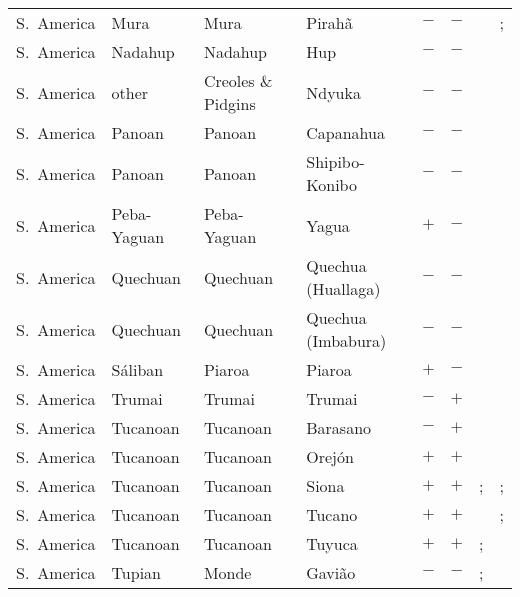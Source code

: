 \begin{landscape}
\begin{longtable}{l>{\raggedright\arraybackslash}p{2.2cm}>{\raggedright}p{2.5cm}>{\raggedright\arraybackslash}p{2.5cm}cc>{\raggedright\arraybackslash}p{3.4cm}>{\raggedright\arraybackslash}p{3.4cm}}
S.~America & Mura & Mura & Pirahã & $-$ & $-$ & \citealt{Gil2013} & \citealt{Corbett2013}; \citealt[281]{Everett1986}\\
S.~America & Nadahup & Nadahup & Hup & $-$ & $-$ & \citealt{Gil2013} & \citealt[191--195, 241--244]{Epps2008}\\
S.~America & other & Creoles \& Pidgins & Ndyuka & $-$ & $-$ & \citealt{Gil2013} & \citealt{Corbett2013}\\
S.~America & Panoan & Panoan & Capanahua & $-$ & $-$ & \citealt{Gil2013} & \citealt[passim]{Loos1969}\\
S.~America & Panoan & Panoan & Shipibo-Konibo & $-$ & $-$ & \citealt{Gil2013} & \citealt{Corbett2013}\\
S.~America & Peba-Yaguan & Peba-Yaguan & Yagua & $+$ & $-$ & \citealt{Gil2013} & \citealt[457, 460--462]{Payne2007}\\
S.~America & Quechuan & Quechuan & Quechua (Huallaga) & $-$ & $-$ & \citealt{Gil2013} & \citealt[passim]{Weber1989}\\
S.~America & Quechuan & Quechuan & Quechua (Imbabura) & $-$ & $-$ & \citealt{Gil2013} & \citealt{Corbett2013}\\
S.~America & Sáliban & Piaroa & Piaroa & $+$ & $-$ & \citealt{Gil2013} & \citealt[passim]{Krute1989}\\
S.~America & Trumai & Trumai & Trumai & $-$ & $+$ & \citealt[68--75]{Guirardello1999} & \citealt[48--55]{Guirardello1999}\\
S.~America & Tucanoan & Tucanoan & Barasano & $-$ & $+$ & \citealt[49--50, 59--60]{Jones1991} & \citealt[31, 73--75]{Jones1991}\\
S.~America & Tucanoan & Tucanoan & Orejón & $+$ & $+$ & \citealt{Gil2013} & \citealt[24--27]{Velie1975}\\
S.~America & Tucanoan & Tucanoan & Siona & $+$ & $+$ & \citealt{Gil2013}; \citealt[256]{Derbyshire1990} & \citealt[2, 91--95, 140--141]{Wheeler1970}; \citealt[256]{Derbyshire1990}\\
S.~America & Tucanoan & Tucanoan & Tucano & $+$ & $+$ & \citealt{Gil2013} & \citealt[255--256]{Derbyshire1990}; \citealt[207--208]{Ramirez1997}\\
S.~America & Tucanoan & Tucanoan & Tuyuca & $+$ & $+$ & \citealt{Gil2013}; \citealt[354]{Derbyshire1990} & \citealt[19, 21--22]{Bowles2008}\\
S.~America & Tupian & Monde & Gavião & $-$ & $-$ & \citealt{Gil2013}; \citealt[246, 248]{Derbyshire1990} & \citealt[passim]{Moore1984}\\

\end{longtable}
\end{landscape}

